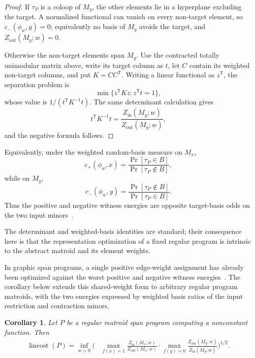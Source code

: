 \documentclass[11pt]{article}
\numberwithin{equation}{section}
\newtheorem{corollary}[definition]{Corollary}
\theoremstyle{remark}
\begin{document}
\begin{proof}
If $\tau_P$ is a coloop of $M_y$, the other elements lie in a hyperplane
excluding the target. A normalized functional can vanish on every
non-target element, so $c_-(\phi_w,y)=0$; equivalently no basis of $M_y$
avoids the target, and $Z_{\mathrm{out}}(M_y;w)=0$.

Otherwise the non-target elements span $M_y$. Use the contracted totally
unimodular matrix above, write its target column as $t$, let $C$ contain its
weighted non-target columns, and put $K=CC^{\mathsf T}$. Writing a linear
functional as $z^{\mathsf T}$, the separation problem is
\begin{equation}
    \min\{z^{\mathsf T}Kz:z^{\mathsf T}t=1\},
\end{equation}
whose value is $1/(t^{\mathsf T}K^{-1}t)$. The same determinant calculation
gives
\begin{equation}
    t^{\mathsf T}K^{-1}t
    =
    \frac{Z_{\mathrm{in}}(M_y;w)}
         {Z_{\mathrm{out}}(M_y;w)},
\end{equation}
and the negative formula follows.
\end{proof}

Equivalently, under the weighted random-basis measure on $M_x$,
\begin{equation}
    c_+(\phi_w,x)
    =
    \frac{\Pr[\tau_P\in B]}{\Pr[\tau_P\notin B]},
\end{equation}
while on $M_y$,
\begin{equation}
    c_-(\phi_w,y)
    =
    \frac{\Pr[\tau_P\notin B]}{\Pr[\tau_P\in B]}.
\end{equation}
Thus the positive and negative witness energies are opposite target-basis
odds on the two input minors~\cite{Lyons2003}.

The determinant and weighted-basis identities are standard; their
consequence here is that the representation optimization of a fixed regular
program is intrinsic to the abstract matroid and its element weights.

In graphic span programs, a single positive edge-weight assignment has
already been optimized against the worst positive and negative witness
energies~\cite[Thm.~12]{JefferyKimmel2017}. The corollary below extends this
shared-weight form to arbitrary regular program matroids, with the two
energies expressed by weighted basis ratios of the input restriction and
contraction minors.

\begin{corollary}
\label{cor:regular-linear-cost}
Let $P$ be a regular matroid span program computing a nonconstant function.
Then
\begin{equation}
\begin{aligned}
    \operatorname{lincost}(P)
    =
    \inf_{w>0}
    \Bigg(&
        \max_{f(x)=1}
        \frac{Z_{\mathrm{in}}(M_x;w)}
             {Z_{\mathrm{out}}(M_x;w)}
        \cdot
        \max_{f(y)=0}
        \frac{Z_{\mathrm{out}}(M_y;w)}
             {Z_{\mathrm{in}}(M_y;w)}
    \Bigg)^{1/2}.
\end{aligned}
\end{equation}
\end{corollary}
\end{document}
